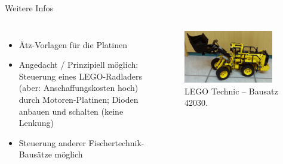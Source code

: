 \documentclass[usenames,dvipsnames]{beamer}
\begin{document}

\begin{frame}{Weitere Infos}
	\begin{columns}[t]
		\begin{itemize}
			\item Ätz-Vorlagen für die Platinen
			\item Angedacht / Prinzipiell möglich: Steuerung eines LEGO-Radladers (aber: Anschaffungskosten hoch) durch Motoren-Platinen; Dioden anbauen und schalten (keine Lenkung)
			\item Steuerung anderer Fischertechnik-Bausätze möglich
		\end{itemize}

		\begin{figure}[t]
			\centering
			\includegraphics[width=0.9\textwidth]{img/radlader2}
			\caption{LEGO Technic -- Bausatz 42030.}
		\end{figure}
	\end{columns}
\end{frame}

\end{document}
